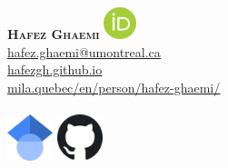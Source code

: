 \documentclass[A4,11pt]{article}
\begin{document}
%
\begin{minipage}[c]{0.4\textwidth}
    \textbf{\Huge \scshape{Hafez Ghaemi}} \href{https://orcid.org/0000-0001-6326-5258}{\includegraphics[width=0.07\textwidth]{orcid}} \\ \vspace{1pt} 
    \href{mailto:hafez.ghaemi@umontreal.ca}{\underline{hafez.ghaemi@umontreal.ca}}\\ \vspace{1pt} 
      \href{https://hafezgh.github.io/}{\underline{hafezgh.github.io}}\\ \vspace{1pt} 
      \href{https://mila.quebec/en/person/hafez-ghaemi/}{\underline{mila.quebec/en/person/hafez-ghaemi/}} \\ \\  \vspace{1pt}
    \href{https://scholar.google.com/citations?user=JCLX6oYAAAAJ&hl=en}{\includegraphics[width=0.1\textwidth]{scholar}}
    \href{https://github.com/hafezgh}{\includegraphics[width=0.1\textwidth]{github}}

\end{minipage}
\end{document}
